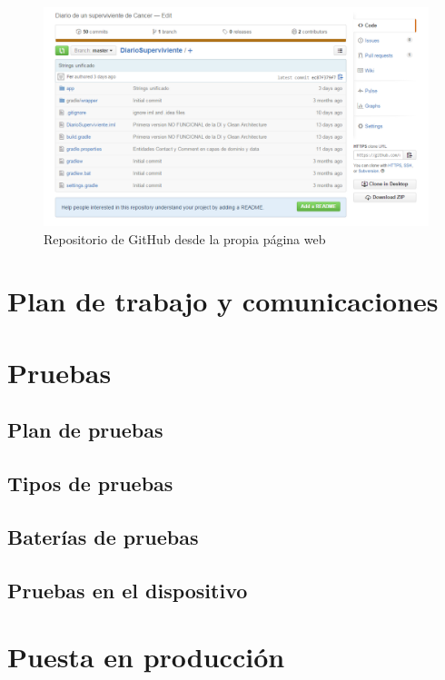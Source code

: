 \documentclass[../pfc.tex]{subfiles}
\begin{document}
	\begin{figure}[H]
		\centering
		\includegraphics[width=1\linewidth]{../images/githubDiarioSuperviviente}
		\caption{Repositorio de GitHub desde la propia página web }
		\label{fig:ghweb}
	\end{figure}

	\clearpage
	
	

	
	\section{Plan de trabajo y comunicaciones}
	
	\section{Pruebas}
	
	\subsection{Plan de pruebas}
	
	\subsection{Tipos de pruebas}
		
	\subsection{Baterías de pruebas}
		
	\subsection{Pruebas en el dispositivo}
	
	\section{Puesta en producción}
	
\end{document}

